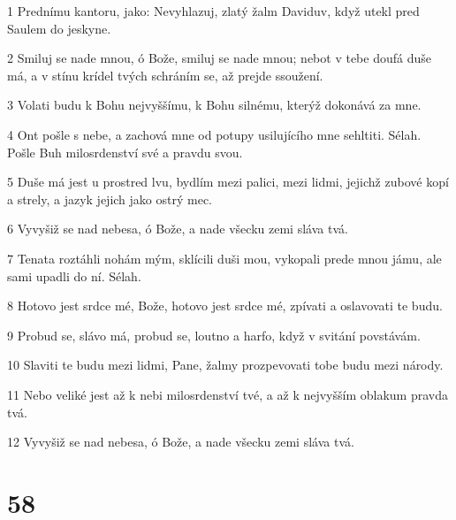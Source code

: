 \par 1 Prednímu kantoru, jako: Nevyhlazuj, zlatý žalm Daviduv, když utekl pred Saulem do jeskyne.
\par 2 Smiluj se nade mnou, ó Bože, smiluj se nade mnou; nebot v tebe doufá duše má, a v stínu krídel tvých schráním se, až prejde ssoužení.
\par 3 Volati budu k Bohu nejvyššímu, k Bohu silnému, kterýž dokonává za mne.
\par 4 Ont pošle s nebe, a zachová mne od potupy usilujícího mne sehltiti. Sélah. Pošle Buh milosrdenství své a pravdu svou.
\par 5 Duše má jest u prostred lvu, bydlím mezi palici, mezi lidmi, jejichž zubové kopí a strely, a jazyk jejich jako ostrý mec.
\par 6 Vyvyšiž se nad nebesa, ó Bože, a nade všecku zemi sláva tvá.
\par 7 Tenata roztáhli nohám mým, sklícili duši mou, vykopali prede mnou jámu, ale sami upadli do ní. Sélah.
\par 8 Hotovo jest srdce mé, Bože, hotovo jest srdce mé, zpívati a oslavovati te budu.
\par 9 Probud se, slávo má, probud se, loutno a harfo, když v svitání povstávám.
\par 10 Slaviti te budu mezi lidmi, Pane, žalmy prozpevovati tobe budu mezi národy.
\par 11 Nebo veliké jest až k nebi milosrdenství tvé, a až k nejvyšším oblakum pravda tvá.
\par 12 Vyvyšiž se nad nebesa, ó Bože, a nade všecku zemi sláva tvá.

\chapter{58}


